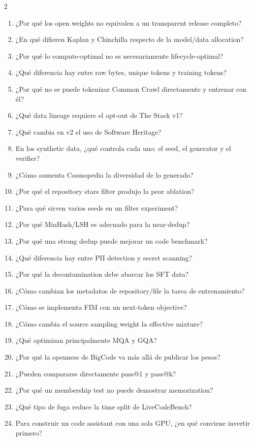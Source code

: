 \begin{multicols}{2}
\footnotesize
\begin{enumerate}
  \setlength{\itemsep}{0pt}
  \item ¿Por qué los open weights no equivalen a un transparent release completo?
  \item ¿En qué difieren Kaplan y Chinchilla respecto de la model/data allocation?
  \item ¿Por qué lo compute-optimal no es necesariamente lifecycle-optimal?
  \item ¿Qué diferencia hay entre raw bytes, unique tokens y training tokens?
  \item ¿Por qué no se puede tokenizar Common Crawl directamente y entrenar con él?
  \item ¿Qué data lineage requiere el opt-out de The Stack v1?
  \item ¿Qué cambia en v2 el uso de Software Heritage?
  \item En los synthetic data, ¿qué controla cada uno: el seed, el generator y el verifier?
  \item ¿Cómo aumenta Cosmopedia la diversidad de lo generado?
  \item ¿Por qué el repository stars filter produjo la peor ablation?
  \item ¿Para qué sirven varios seeds en un filter experiment?
  \item ¿Por qué MinHash/LSH es adecuado para la near-dedup?
  \item ¿Por qué una strong dedup puede mejorar un code benchmark?
  \item ¿Qué diferencia hay entre PII detection y secret scanning?
  \item ¿Por qué la decontamination debe abarcar los SFT data?
  \item ¿Cómo cambian los metadatos de repository/file la tarea de entrenamiento?
  \item ¿Cómo se implementa FIM con un next-token objective?
  \item ¿Cómo cambia el source sampling weight la effective mixture?
  \item ¿Qué optimizan principalmente MQA y GQA?
  \item ¿Por qué la openness de BigCode va más allá de publicar los pesos?
  \item ¿Pueden compararse directamente pass@1 y pass@k?
  \item ¿Por qué un membership test no puede demostrar memorization?
  \item ¿Qué tipo de fuga reduce la time split de LiveCodeBench?
  \item Para construir un code assistant con una sola GPU, ¿en qué conviene invertir primero?
\end{enumerate}
\end{multicols}

